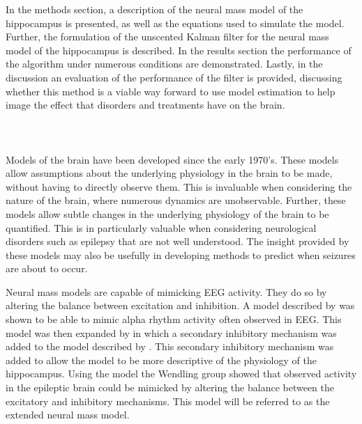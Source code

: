 In the methods section, a description of the neural mass model of the hippocampus is presented, as well as the equations used to simulate the model. Further, the formulation of the unscented Kalman filter for the neural mass model of the hippocampus is described. In the results section the performance of the algorithm under numerous conditions are demonstrated. Lastly, in the discussion an evaluation of the performance of the filter is provided, discussing whether this method is a viable way forward to use model estimation to help image the effect that disorders and treatments have on the brain.  \\\\\\\\















Models of the brain have been developed since the early 1970's. These models allow assumptions about the underlying physiology in the brain to be made, without having to directly observe them. This is invaluable when considering the nature of the brain, where numerous dynamics are unobservable. Further, these models allow subtle changes in the underlying physiology of the brain to be quantified. This is in particularly valuable when considering neurological disorders such as epilepsy that are not well understood. The insight provided by these models may also be usefully in developing methods to predict when seizures are about to occur.

Neural mass models are capable of mimicking EEG activity. They do so by altering the balance between excitation and inhibition. A model described by \cite{jansen1995electroencephalogram} was shown to be able to mimic alpha rhythm activity often observed in EEG. This model was then expanded by \cite{wendling2002epileptic} in which a secondary inhibitory mechanism was added to the model described by \cite{jansen1995electroencephalogram}. This secondary inhibitory mechanism was added to allow the model to be more descriptive of the physiology of the hippocampus. Using the model the Wendling group showed that observed activity in the epileptic brain could be mimicked by altering the balance between the excitatory and inhibitory mechanisms. This model will be referred to as the extended neural mass model.

